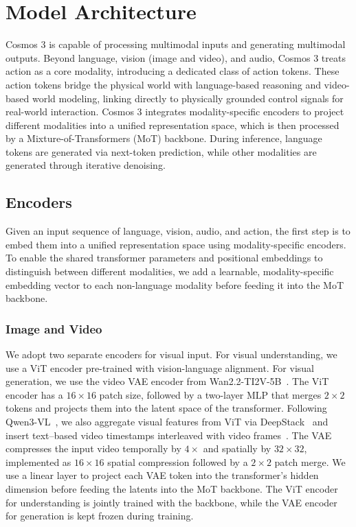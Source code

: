 \section{Model Architecture}
\label{sec::model}

Cosmos 3 is capable of processing multimodal inputs and generating multimodal outputs. Beyond language, vision (image and video), and audio, Cosmos 3 treats action as a core modality, introducing a dedicated class of action tokens. These action tokens bridge the physical world with language-based reasoning and video-based world modeling, linking directly to physically grounded control signals for real-world interaction. Cosmos 3 integrates modality-specific encoders to project different modalities into a unified representation space, which is then processed by a Mixture-of-Transformers (MoT) backbone. During inference, language tokens are generated via next-token prediction, while other modalities are generated through iterative denoising.

\subsection{Encoders}
Given an input sequence of language, vision, audio, and action, the first step is to embed them into a unified representation space using modality-specific encoders. To enable the shared transformer parameters and positional embeddings to distinguish between different modalities, we add a learnable, modality-specific embedding vector to each non-language modality before feeding it into the MoT backbone.

\subsubsection{Image and Video}
We adopt two separate encoders for visual input. For visual understanding, we use a ViT encoder pre-trained with vision-language alignment. For visual generation, we use the video VAE encoder from Wan2.2-TI2V-5B~\citep{wan2025}. The ViT encoder has a $16\times16$ patch size, followed by a two-layer MLP that merges $2\times2$ tokens and projects them into the latent space of the transformer. Following Qwen3-VL~\citep{qwen3vl2025}, we also aggregate visual features from ViT via DeepStack~\citep{meng2024deepstack} and insert text–based video timestamps interleaved with video frames~\citep{chen2024timemarker}. The VAE compresses the input video temporally by $4\times$ and spatially by $32\times32$, implemented as $16\times16$ spatial compression followed by a $2\times2$ patch merge. We use a linear layer to project each VAE token into the transformer's hidden dimension before feeding the latents into the MoT backbone. The ViT encoder for understanding is jointly trained with the backbone, while the VAE encoder for generation is kept frozen during training.

